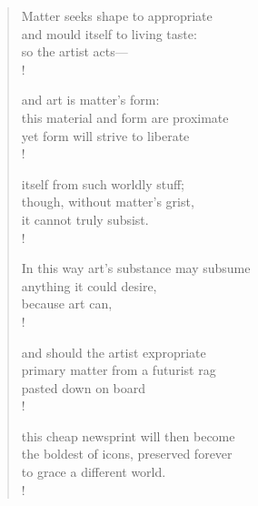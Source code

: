\begin{verse}

Matter seeks shape to appropriate\\
and mould itself to living taste:\\
so the artist acts---\\!

and art is matter's form:\\
this material and form are proximate\\
yet form will strive to liberate\\!

itself from such worldly stuff;\\
though, without matter's grist,\\
it cannot truly subsist.\\!

In this way art's substance may subsume\\
anything it could desire,\\
because art can,\\!

and should the artist expropriate\\
primary matter from a futurist rag\\
pasted down on board\\!

this cheap newsprint will then become\\
the boldest of icons, preserved forever \\
to grace a different world.\\!

\end{verse}
